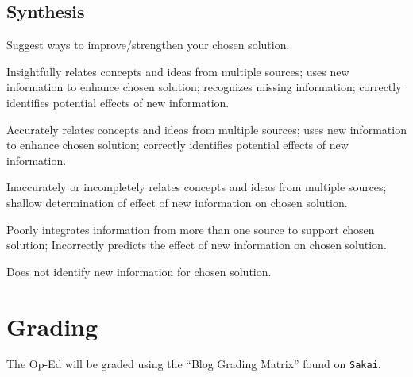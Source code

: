 \documentclass{tufte-handout}\usepackage[]{graphicx}\usepackage[]{color}
\newenvironment{enumerate*}%
  {\begin{enumerate}%
    \setlength{\itemsep}{0pt}%
    \setlength{\parskip}{0pt}}%
  {\end{enumerate}}
\begin{document}
\subsection{Synthesis}

Suggest ways to improve/strengthen your chosen solution.

\begin{enumerate*}
	\item Insightfully relates concepts and ideas from multiple sources; uses new information to enhance chosen solution; recognizes missing information; correctly identifies potential effects of new information.	
	\item Accurately relates concepts and ideas from multiple sources; uses new information to enhance chosen solution; correctly identifies potential effects of new information.	
	\item Inaccurately or incompletely relates concepts and ideas from multiple sources; shallow determination of effect of new information on chosen solution.	
	\item Poorly integrates information from more than one source to support chosen solution; Incorrectly predicts the effect of new information on chosen solution.	
	\item Does not identify new information for chosen solution.	
\end{enumerate*}

\section{Grading}

The Op-Ed will be graded using the ``Blog Grading Matrix'' found on \texttt{Sakai}.
\end{document}
